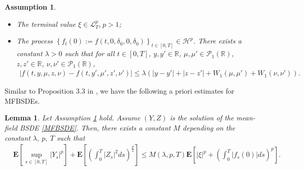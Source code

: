 \documentclass[10pt]{article}%
\numberwithin{equation}{section}
\newtheorem{lemma}[theorem]{Lemma}
\newtheorem{assumption}[theorem]{Assumption}
\def \E{\mathbf{E}}
\begin{document}
\begin{assumption}\label{asslip2}
  \begin{itemize}
   \item [(i)] The terminal value $\xi\in \mathcal{L}^p_T$,$ \ p>1$;
      \item [(ii)] The process $\left\{f_t(0):=f(t,0,\delta_0,0,\delta_0)\right\}_{t\in[0,T]}\in \mathcal{H}^p$. There exists a constant $\lambda>0$ such that for all $t\in[0,T]$, $y, y'\in \mathbb{R}$, $\mu, \mu' \in \mathcal{P}_1(\mathbb{R})$, $z, z'\in \mathbb{R}$, $\nu, \nu'\in\mathcal{P}_1(\mathbb{R})$,
      \begin{align*}
\left|f(t,y,\mu,z,\nu)-f(t,y',\mu',z',\nu')\right|\leq \lambda\left(\left|y-y'\right|+\left|z-z'\right|+W_1(\mu,\mu')+W_1(\nu,\nu')\right).
\end{align*}
  \end{itemize}  
\end{assumption}

Similar to Proposition 3.3 in \cite{LX}, we have the following a priori estimates for MFBSDEs. 
\begin{lemma}\label{proMFBSDE}
Let Assumption \ref{asslip2} hold. Assume $(Y, Z)$ is the solution of the mean-field BSDE \eqref{MFBSDE}. Then, there exists a constant $M$ depending on the constant $\lambda,\ p,\ T$ such that
\begin{align}
&\E\left[ \sup_{s \in [0,T]} |Y_s|^p \right] + \E\left[\left(\int_0^T |Z_s|^2ds\right)^{\frac{p}{2}} \right]\leq M(\lambda, p, T) \E\left[ |\xi|^p + \left( \int_0^T |f_s(0)| ds \right)^p\right].
\end{align}
\end{lemma}
 
\iffalse
\end{document}
